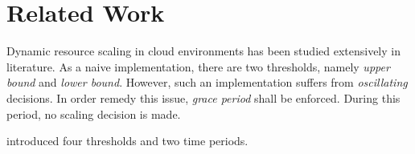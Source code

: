 \chapter{Related Work}
Dynamic resource scaling in cloud environments has been studied extensively in literature. As a naive implementation, there are two thresholds, namely \emph{upper bound} and \emph{lower bound}. However, such an implementation suffers from \emph{oscillating} decisions. In order remedy this issue, \emph{grace period} shall be enforced. During this period, no scaling decision is made. 

\textcite{Hasan2012IntegratedAA} introduced four thresholds and two time periods.